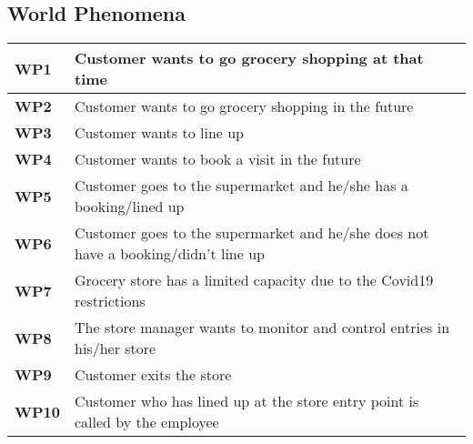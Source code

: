 \subsection{World Phenomena}
\begin{center}
    {\renewcommand{\arraystretch}{2}%
    \begin{tabular}{L{2cm}L{12cm}}
        \hline
        \textbf{WP1} & Customer wants to go grocery shopping at that time \\
        \hline
        \textbf{WP2} & Customer wants to go grocery shopping in the future \\
        \hline
        \textbf{WP3} & Customer wants to line up \\
        \hline
        \textbf{WP4} & Customer wants to book a visit in the future \\
        \hline
        \textbf{WP5} & Customer goes to the supermarket and he/she has a booking/lined up \\
        \hline
        \textbf{WP6} & Customer goes to the supermarket and he/she does not have a booking/didn't line up \\
        \hline
        \textbf{WP7} & Grocery store has a limited capacity due to the Covid19 restrictions \\
        \hline
        \textbf{WP8} & The store manager wants to monitor and control entries in his/her store \\
        \hline
        \textbf{WP9} & Customer exits the store \\
        \hline
        \textbf{WP10} & Customer who has lined up at the store entry point is called by the employee \\
        \hline
    \end{tabular}}
\end{center}

